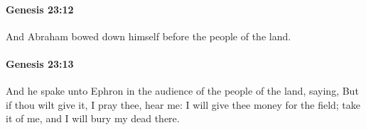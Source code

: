 		\paragraph{Genesis 23:12} %
			\label{GENESIS-23-12}

			And Abraham bowed down himself before the people of the land.


		\paragraph{Genesis 23:13} %
			\label{GENESIS-23-13}

			And he spake unto Ephron in the audience of the people of the land, saying, But if thou wilt give it, I pray thee, hear me: I will give thee money for the field; take it of me, and I will bury my dead there.


